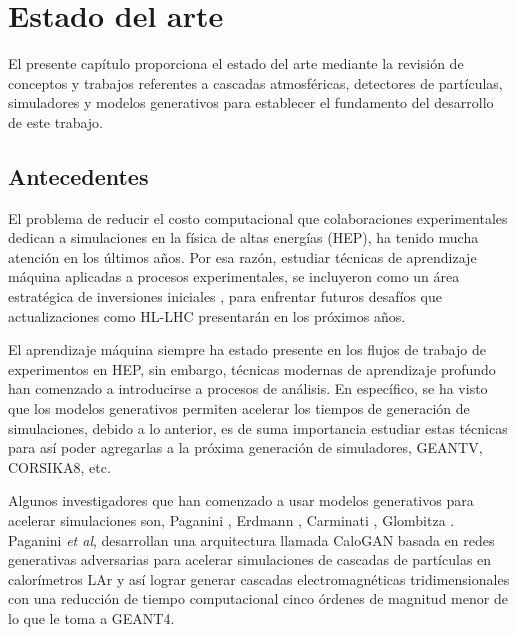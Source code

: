
\chapter{Estado del arte} %

\label{Chapter2} %

El presente capítulo proporciona el estado del arte mediante la revisión de conceptos y trabajos referentes a cascadas atmosféricas, detectores de partículas, simuladores y modelos generativos para establecer el fundamento del desarrollo de este trabajo. 

\section{Antecedentes}

El problema de reducir el costo computacional que colaboraciones experimentales dedican a simulaciones en la física de altas energías (HEP), ha tenido mucha atención en los últimos años. Por esa razón, estudiar técnicas de aprendizaje máquina aplicadas a procesos experimentales, se incluyeron como un área estratégica de inversiones iniciales \parencite{Elmer2017}, para enfrentar futuros desafíos que actualizaciones como HL-LHC presentarán en los próximos años. 

El aprendizaje máquina siempre ha estado presente en los flujos de trabajo de experimentos en HEP, sin embargo, técnicas modernas de aprendizaje profundo han comenzado a introducirse a procesos de análisis. En específico, se ha visto que los modelos generativos permiten acelerar los tiempos de generación de simulaciones, debido a lo anterior, es de suma importancia estudiar estas técnicas para así poder agregarlas a la próxima generación de simuladores, GEANTV, CORSIKA8, etc.

Algunos investigadores que han comenzado a usar modelos generativos para acelerar simulaciones son, Paganini \parencite{Paganini2017,Paganini2017b}, Erdmann \parencite{Erdmann2019,Erdmann2018}, Carminati \parencite{Carminati2018,Carminati2020}, Glombitza \parencite{Glombitza2020,Erdmann2018b}.
Paganini \emph{et al}, desarrollan una arquitectura llamada CaloGAN basada en redes generativas adversarias para acelerar simulaciones de cascadas de partículas en calorímetros LAr y así lograr generar cascadas electromagnéticas tridimensionales con una reducción de tiempo computacional cinco órdenes de magnitud menor de lo que le toma a GEANT4.

